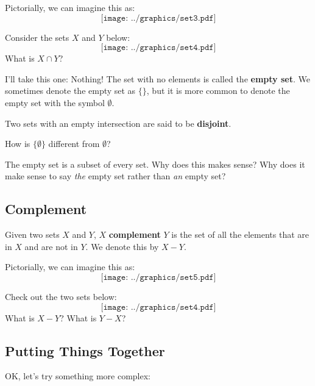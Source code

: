 Pictorially, we can imagine this as:
\[
\texttt{[image: ../graphics/set3.pdf]}
\]

\begin{question} Consider the sets $X$ and $Y$ below:
\[
\texttt{[image: ../graphics/set4.pdf]}
\]
What is $X\cap Y$?
\end{question}

I'll take this one: Nothing! The set with no elements is called the \textbf{empty set}. We sometimes denote the empty set as $\{\}$, but it is more common to denote the empty set with the symbol $\emptyset$.  
\begin{definition}
Two sets with an empty intersection are said to be \textbf{disjoint}.
\end{definition}

\begin{question}
How is $\{\emptyset\}$ different from $\emptyset$?  
\end{question}
\QM

\begin{question}
The empty set is a subset of every set.  Why does this makes sense?  Why does it make sense 
to say \emph{the} empty set rather than \emph{an} empty set?  
\end{question}
\QM


\subsection{Complement}
\begin{definition} Given two sets $X$ and $Y$, 
$X$ \textbf{complement} $Y$ is the set of all the elements that are in $X$ and are not in $Y$. We denote this by $X-Y$.
\end{definition}

Pictorially, we can imagine this as:
\[
\texttt{[image: ../graphics/set5.pdf]}
\]

\begin{question} Check out the two sets below:
\[
\texttt{[image: ../graphics/set4.pdf]}
\]
What is $X-Y$? What is $Y-X$?
\end{question}
\QM


\subsection{Putting Things Together}
OK, let's try something more complex:

